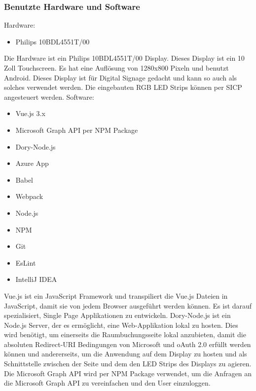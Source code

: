 \subsubsection{Benutzte Hardware und Software}
Hardware:
\begin{itemize}
    \item Philips 10BDL4551T/00
\end{itemize}
\newline
Die Hardware ist ein Philips 10BDL4551T/00 Display.
Dieses Display ist ein 10 Zoll Touchscreen.
Es hat eine Auflösung von 1280x800 Pixeln und benutzt Android.
Dieses Display ist für Digital Signage gedacht und kann so auch als solches verwendet werden.
Die eingebauten RGB LED Strips können per SICP angesteuert werden.
\newline
\newline
Software:
\begin{itemize}
    \item Vue.js 3.x
    \item Microsoft Graph API per NPM Package
    \item Dory-Node.js
    \item Azure App
    \item Babel
    \item Webpack
    \item Node.js
    \item NPM
    \item Git
    \item EsLint
    \item IntelliJ IDEA
\end{itemize}
\newline
Vue.js ist ein JavaScript Framework und transpiliert die Vue.js Dateien in JavaScript, damit sie von jedem Browser ausgeführt werden können.
Es ist darauf spezialisiert,  Single Page Applikationen zu entwickeln.
\newline
\newline
Dory-Node.js ist ein Node.js Server, der es ermöglicht, eine Web-Applikation lokal zu hosten.
Dies wird benötigt, um einerseits die Raumbuchungsseite lokal anzubieten, damit die absoluten Redirect-URI Bedingungen von Microsoft und oAuth 2.0 erfüllt werden können und andererseits, um die Anwendung auf dem Display zu hosten und als Schnittstelle zwischen der Seite und dem den LED Strips des Displays zu agieren.
\newline
\newline
Die Microsoft Graph API wird per NPM Package verwendet, um die Anfragen an die Microsoft Graph API zu vereinfachen und den User einzuloggen.
